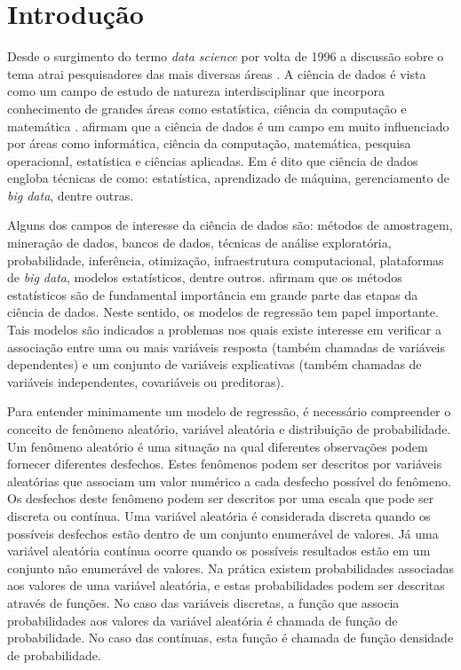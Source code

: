 \chapter{Introdução}

\label{cap:intro}


Desde o surgimento do termo \emph{data science} por volta de 1996 \citep{histds} a discussão sobre o tema atrai pesquisadores das mais diversas áreas \citep{cao2016data}. A ciência de dados é vista como um campo de estudo de natureza interdisciplinar que incorpora conhecimento de grandes áreas como estatística, ciência da computação e matemática \citep{ley2018makes}. \citet{weihs2018data} afirmam que a ciência de dados é um campo em muito influenciado por áreas como informática, ciência da computação, matemática, pesquisa operacional, estatística e ciências aplicadas. Em \citep{cao2016data} é dito que ciência de dados engloba técnicas de como: estatística, aprendizado de máquina, gerenciamento de \emph{big data}, dentre outras. 

Alguns dos campos de interesse da ciência de dados são: métodos de amostragem, mineração de dados, bancos de dados, técnicas de análise exploratória, probabilidade, inferência, otimização, infraestrutura computacional, plataformas de \emph{big data}, modelos estatísticos, dentre outros. \citet{weihs2018data} afirmam que os métodos estatísticos são de fundamental importância em grande parte das etapas da ciência de dados. Neste sentido, os modelos de regressão tem papel importante. Tais modelos são indicados a problemas nos quais existe interesse em verificar a associação entre uma ou mais variáveis resposta (também chamadas de variáveis dependentes) e um conjunto de variáveis explicativas (também chamadas de variáveis independentes, covariáveis ou preditoras). 

Para entender minimamente um modelo de regressão, é necessário compreender o conceito de fenômeno aleatório, variável aleatória e distribuição de probabilidade. Um fenômeno aleatório é uma situação na qual diferentes observações podem fornecer diferentes desfechos. Estes fenômenos podem ser descritos por variáveis aleatórias que associam um valor numérico a cada desfecho possível do fenômeno. Os desfechos deste fenômeno podem ser descritos por uma escala que pode ser discreta ou contínua. Uma variável aleatória é considerada discreta quando os possíveis desfechos estão dentro de um conjunto enumerável de valores. Já uma variável aleatória contínua ocorre quando os possíveis resultados estão em um conjunto não enumerável de valores. Na prática existem probabilidades associadas aos valores de uma variável aleatória, e estas probabilidades podem ser descritas através de funções. No caso das variáveis discretas, a função que associa probabilidades aos valores da variável aleatória é chamada de função de probabilidade. No caso das contínuas, esta função é chamada de função densidade de probabilidade.

